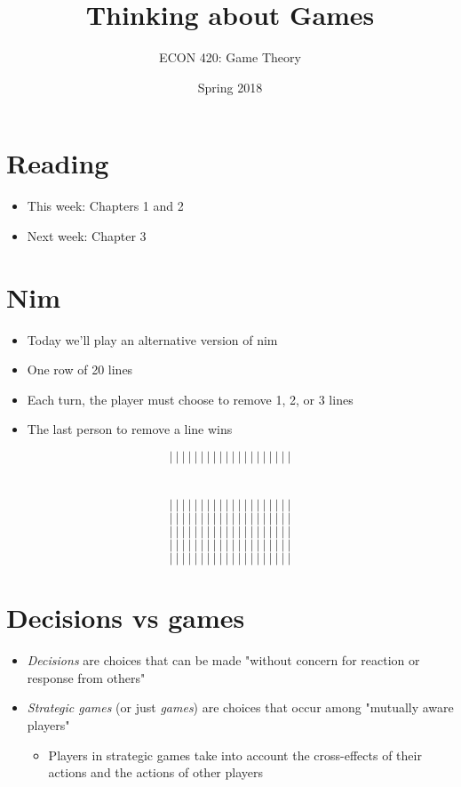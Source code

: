 \documentclass[11pt]{article}
\author{ECON 420: Game Theory}
\date{Spring 2018}
\title{Thinking about Games}
\begin{document}
\maketitle

\section*{Reading}
\label{sec:org4bcf18c}
\begin{itemize}
\item This week: Chapters 1 and 2
\item Next week: Chapter 3
\end{itemize}

\section*{Nim}
\label{sec:org1e44c1f}
\begin{itemize}
\item Today we'll play an alternative version of nim
\item One row of 20 lines
\item Each turn, the player must choose to remove 1, 2, or 3 lines
\item The last person to remove a line wins
\end{itemize}
$$|~|~|~|~|~|~|~|~|~|~|~|~|~|~|~|~|~|~|~|$$

\section*{}
\label{sec:orgeb1cfd3}
$$|~|~|~|~|~|~|~|~|~|~|~|~|~|~|~|~|~|~|~|$$
$$|~|~|~|~|~|~|~|~|~|~|~|~|~|~|~|~|~|~|~|$$
$$|~|~|~|~|~|~|~|~|~|~|~|~|~|~|~|~|~|~|~|$$
$$|~|~|~|~|~|~|~|~|~|~|~|~|~|~|~|~|~|~|~|$$
$$|~|~|~|~|~|~|~|~|~|~|~|~|~|~|~|~|~|~|~|$$

\section*{Decisions vs games}
\label{sec:org8a82adf}
\begin{itemize}
\item \emph{Decisions} are choices that can be made "without concern for reaction or response from others"
\item \emph{Strategic games} (or just \emph{games}) are choices that occur among "mutually aware players"
\begin{itemize}
\item Players in strategic games take into account the cross-effects of their actions and the actions of other players
\end{itemize}
\end{itemize}
\end{document}
